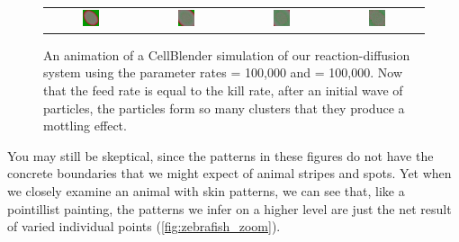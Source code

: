 \begin{figure}[h]
\begin{tabular}{c c c c}
\includegraphics[width = 0.2\textwidth]{../images/predator_prey_11_by_11_f_1_k_1_i4.png} & \includegraphics[width = 0.2\textwidth]{../images/../images/predator_prey_11_by_11_f_1_k_1_i5.png} & \includegraphics[width = 0.2\textwidth]{../images/../images/predator_prey_11_by_11_f_1_k_1_i6.png} & \includegraphics[width = 0.2\textwidth]{../images/../images/predator_prey_11_by_11_f_1_k_1_i7.png}
\end{tabular}
\caption{An animation of a CellBlender simulation of our reaction-diffusion system using the parameter rates  = 100,000 and  = 100,000. Now that the feed rate is equal to the kill rate, after an initial wave of  particles, the  particles form so many clusters that they produce a mottling effect.}
\label{fig:k=100000_f=100000}
\end{figure}

You may still be skeptical, since the patterns in these figures do not have the concrete boundaries that we might expect of animal stripes and spots. Yet when we closely examine an animal with skin patterns, we can see that, like a pointillist painting, the patterns we infer on a higher level are just the net result of varied individual points (\autoref{fig:zebrafish_zoom}).\\

